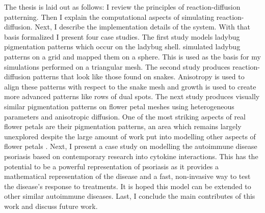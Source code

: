 The thesis is laid out as follows: I review the principles of reaction-diffusion patterning. Then I explain the computational aspects of simulating reaction-diffusion. Next, I describe the implementation details of the \ProgramName{} system. With that basis formalized I present four case studies. The first study models ladybug pigmentation patterns which occur on the ladybug shell. \citep{liaw2001} simulated ladybug patterns on a grid and mapped them on a sphere. This is used as the basis for my simulations performed on a triangular mesh. The second study produces reaction-diffusion patterns that look like those found on snakes. Anisotropy is used to align these patterns with respect to the snake mesh and growth is used to create more advanced patterns like rows of dual spots. The next study produces visually similar pigmentation patterns on flower petal meshes using heterogeneous parameters and anisotropic diffusion. One of the most striking aspects of real flower petals are their pigmentation patterns, an area which remains largely unexplored despite the large amount of work put into modelling other aspects of flower petals \citep{owens2016}. Next, I present a case study on modelling the autoimmune disease psoriasis based on contemporary research into cytokine interactions. This has the potential to be a powerful representation of psoriasis as it provides a mathematical representation of the disease and a fast, non-invasive way to test the disease's response to treatments. It is hoped this model can be extended to other similar autoimmune diseases. Last, I conclude the main contributes of this work and discuss future work.